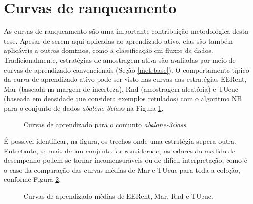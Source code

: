 \section{Curvas de ranqueamento}\label{sec:curvas}
As curvas de ranqueamento são uma importante contribuição metodológica desta tese.
Apesar de serem aqui aplicadas ao aprendizado ativo, elas são também aplicáveis a outros domínios, como a classificação em fluxos de dados.
Tradicionalmente, estratégias de amostragem ativa são avaliadas por meio de curvas de aprendizado convencionais (Seção \ref{metrbase}).
O comportamento típico da curva de aprendizado ativo pode ser visto nas curvas das estratégias EERent, Mar (baseada na margem de incerteza), Rnd (amostragem aleatória) e TUeuc (baseada em densidade que considera exemplos rotulados) com o algoritmo NB para o conjunto de dados \textit{abalone-3class} na Figura \ref{curvasilustra}.
\begin{figure}
	\centering
	
	\caption{Curvas de aprendizado para o conjunto \textit{abalone-3class}.}
	\label{curvasilustra}
\end{figure}

É possível identificar, na figura, os trechos onde uma estratégia supera outra.
Entretanto, se mais de um conjunto for considerado, os valores da medida de desempenho podem se tornar incomensuráveis \cite{journals/jmlr/Demsar06} ou de difícil interpretação, como é o caso da comparação das curvas médias de Mar e TUeuc para toda a coleção, conforme Figura \ref{curvasilustraall}.
\begin{figure}
	\centering
	
	\caption{Curvas de aprendizado médias de EERent, Mar, Rnd e TUeuc.}
	\label{curvasilustraall}
\end{figure}

